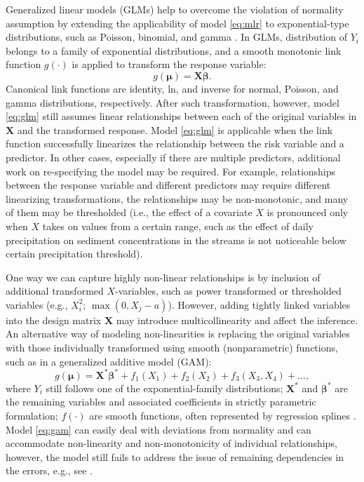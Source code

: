 \documentclass[
]{book}
\begin{document}
Generalized linear models (GLMs) help to overcome the violation of normality assumption by extending the applicability of model \eqref{eq:mlr} to exponential-type distributions, such as Poisson, binomial, and gamma \citep{Wood:2006book}. In GLMs, distribution of \(Y_i\) belongs to a family of exponential distributions, and a smooth monotonic link function \(g(\cdot)\) is applied to transform the response variable:
\begin{equation}
    \label{eq:glm}
    g(\boldsymbol{\mu}) = \mathbf{X}\boldsymbol{\beta}.
\end{equation}
Canonical link functions are identity, ln, and inverse for normal, Poisson, and gamma distributions, respectively. After such transformation, however, model \eqref{eq:glm} still assumes linear relationships between each of the original variables in \(\mathbf{X}\) and the transformed response. Model \eqref{eq:glm} is applicable when the link function successfully linearizes the relationship between the risk variable and a predictor. In other cases, especially if there are multiple predictors, additional work on re-specifying the model may be required. For example, relationships between the response variable and different predictors may require different linearizing transformations, the relationships may be non-monotonic, and many of them may be thresholded (i.e., the effect of a covariate \(X\) is pronounced only when \(X\) takes on values from a certain range, such as the effect of daily precipitation on sediment concentrations in the streams is not noticeable below certain precipitation threshold).

One way we can capture highly non-linear relationships is by inclusion of additional transformed \(X\)-variables, such as power transformed or thresholded variables (e.g., \(X_i^2\); \(\max(0, X_j - a)\)). However, adding tightly linked variables into the design matrix \(\mathbf{X}\) may introduce multicollinearity and affect the inference. An alternative way of modeling non-linearities is replacing the original variables with those individually transformed using smooth (nonparametric) functions, such as in a generalized additive model (GAM):
\begin{equation}
    \label{eq:gam}
    g(\boldsymbol{\mu}) = \mathbf{X}^*\boldsymbol{\beta}^* + f_1(X_1) + f_2(X_2) + f_3(X_3,X_4) + \ldots,
\end{equation}
where \(Y_i\) still follows one of the exponential-family distributions; \(\mathbf{X}^*\) and \(\boldsymbol{\beta}^*\) are the remaining variables and associated coefficients in strictly parametric formulation; \(f(\cdot)\) are smooth functions, often represented by regression splines \citep{Wood:2006book}. Model \eqref{eq:gam} can easily deal with deviations from normality and can accommodate non-linearity and non-monotonicity of individual relationships, however, the model still fails to address the issue of remaining dependencies in the errors, e.g., see \citet{Kohn:etal:2000}.
\end{document}
